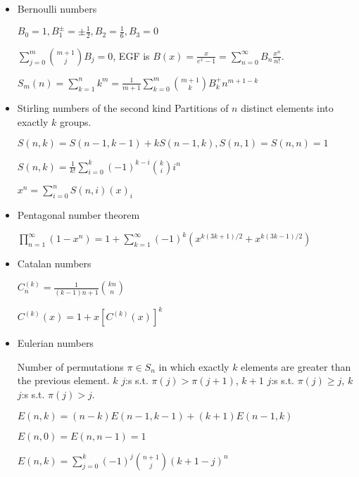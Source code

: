 \begin{itemize}
\item Bernoulli numbers

$B_0=1,B_1^{\pm}=\pm\frac{1}{2},B_2=\frac{1}{6},B_3=0$

$\displaystyle\sum_{j=0}^m\binom{m+1}{j}B_j=0$, EGF is $B(x) = \frac{x}{e^x - 1}=\displaystyle\sum_{n=0}^\infty B_n\frac{x^n}{n!}$.

$S_m(n)=\displaystyle\sum_{k=1}^nk^m=\frac{1}{m+1}\sum_{k=0}^m\binom{m+1}{k}B^{+}_kn^{m+1-k}$

\item Stirling numbers of the second kind
Partitions of $n$ distinct elements into exactly $k$ groups. 

$S(n, k) = S(n - 1, k - 1) + kS(n - 1, k), S(n, 1) = S(n, n) = 1$

$S(n, k) = \frac{1}{k!}\sum_{i=0}^{k}(-1)^{k-i}{k \choose i}i^n$

$x^n     = \sum_{i=0}^{n} S(n, i) (x)_i$

\item Pentagonal number theorem

$\displaystyle\prod_{n=1}^{\infty}(1-x^n)=1+\sum_{k=1}^{\infty}(-1)^k\left(x^{k(3k+1)/2} + x^{k(3k-1)/2}\right)$

\item Catalan numbers

$C^{(k)}_n = \displaystyle \frac{1}{(k - 1)n + 1}\binom{kn}{n}$

$C^{(k)}(x) = 1 + x [C^{(k)}(x)]^k$

\item Eulerian numbers

Number of permutations $\pi \in S_n$ in which exactly $k$ elements are greater than the previous element. $k$ $j$:s s.t. $\pi(j)>\pi(j+1)$, $k+1$ $j$:s s.t. $\pi(j)\geq j$, $k$ $j$:s s.t. $\pi(j)>j$.

$E(n,k) = (n-k)E(n-1,k-1) + (k+1)E(n-1,k)$

$E(n,0) = E(n,n-1) = 1$

$E(n,k) = \sum_{j=0}^k(-1)^j\binom{n+1}{j}(k+1-j)^n$

\end{itemize}